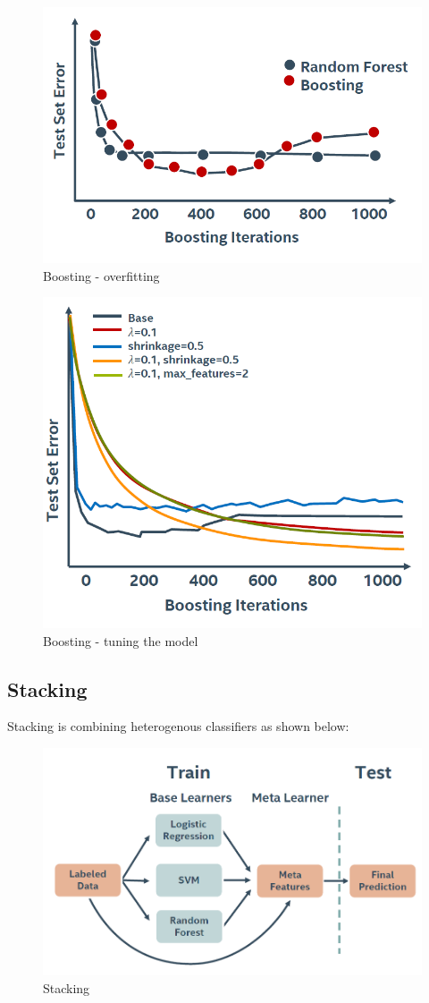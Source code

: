 \documentclass[11pt]{book}
\begin{document}
\begin{figure}[H]
    \centering
    \includegraphics[width=0.5\linewidth]{boost5.PNG}
    \caption{Boosting - overfitting}
    \label{fig:my_label}
\end{figure}

\begin{figure}[H]
    \centering
    \includegraphics[width=0.5\linewidth]{boost6.PNG}
    \caption{Boosting - tuning the model}
    \label{fig:my_label}
\end{figure}

\subsection{Stacking}

Stacking is combining heterogenous classifiers as shown below:

\begin{figure}[H]
    \centering
    \includegraphics[width=0.5\linewidth]{stack.PNG}
    \caption{Stacking}
    \label{fig:my_label}
\end{figure}
\end{document}
